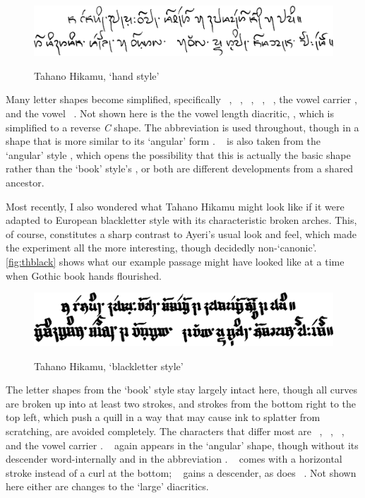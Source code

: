 \begin{figure}[ht]\centering
\caption{Tahano Hikamu, `hand style'}
\includegraphics[width=0.75\linewidth]{images/tahanohand-300dpi-bw.png}
\label{fig:thhand}
\end{figure}

Many letter shapes become simplified, specifically ~,
~, ~, ~, ~,
the vowel carrier , and the vowel ~. Not shown here is
the the vowel length diacritic, , which is simplified to a reverse
\textit{C} shape. The abbreviation  is used throughout,
though in a shape that is more similar to its `angular' form \ayr{\itshape \&}.
~ is also taken from the `angular' style , 
which opens the possibility that this is actually the basic shape rather than 
the `book' style's , or both are different developments from a shared 
ancestor.

Most recently, I also wondered what Tahano Hikamu might look like if it were 
adapted to European blackletter style with its characteristic broken arches. 
This, of course, constitutes a sharp contrast to Ayeri's usual look and feel, 
which made the experiment all the more interesting, though decidedly 
non-`canonic'. \autoref{fig:thblack} shows what our example passage might have 
looked like at a time when Gothic book hands flourished.

\begin{figure}[ht]\centering
\caption{Tahano Hikamu, `blackletter style'}
\includegraphics[width=0.75\linewidth]{images/tahanoblack-300dpi-bw.png}
\label{fig:thblack}
\end{figure}

The letter shapes from the `book' style stay largely intact here, though all
curves are broken up into at least two strokes, and strokes from the bottom
right to the top left, which push a quill in a way that may cause ink to
splatter from scratching, are avoided completely. The characters that differ
most are ~, ~, ~, and the
vowel carrier . ~ again appears in the `angular' shape,
though without its descender word-internally and in the abbreviation
. ~ comes with a horizontal stroke instead of a
curl at the bottom; ~ gains a descender, as does
~. Not shown here either are changes to the `large' diacritics.


